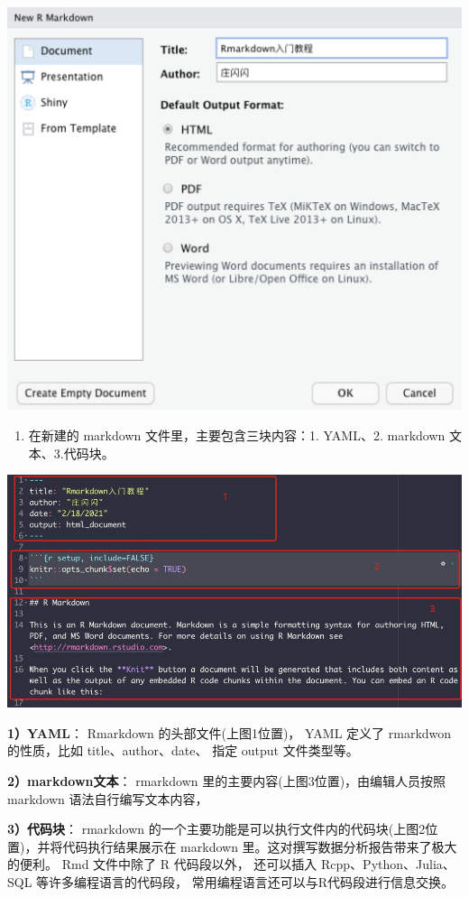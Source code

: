 \documentclass[
]{book}
\providecommand{\tightlist}{%
  \setlength{\itemsep}{0pt}\setlength{\parskip}{0pt}}
\begin{document}
\includegraphics{images/paste-AF884A89.png}

\begin{enumerate}
\def\labelenumi{\arabic{enumi}.}
\setcounter{enumi}{2}
\tightlist
\item
  在新建的 markdown 文件里，主要包含三块内容：1. YAML、2. markdown
  文本、3.代码块。
\end{enumerate}

\includegraphics{images/paste-09A826E7.png}

\textbf{1）YAML}： Rmarkdown 的头部文件(上图1位置)， YAML 定义了 rmarkdwon
的性质，比如 title、author、date、 指定 output 文件类型等。

\textbf{2）markdown文本}： rmarkdown 里的主要内容(上图3位置)，由编辑人员按照
markdown 语法自行编写文本内容，

\textbf{3）代码块}： rmarkdown
的一个主要功能是可以执行文件内的代码块(上图2位置)，并将代码执行结果展示在
markdown 里。这对撰写数据分析报告带来了极大的便利。 Rmd 文件中除了 R
代码段以外， 还可以插入 Rcpp、Python、Julia、SQL
等许多编程语言的代码段， 常用编程语言还可以与R代码段进行信息交换。
\end{document}

